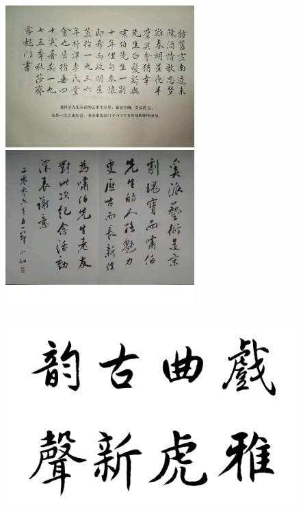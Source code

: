 \documentclass[cjk,slidestop,compress,mathserif,blue]{beamer}
\begin{document}
\frame
{
	\frametitle{}
\begin{figure}[h!]
\centering
\vspace{-0.15in}
\includegraphics[height=0.45\textwidth,width=0.65\textwidth,clip]{Figures_Peking-Opera/PekOpe_Wu-1.jpg}
\vskip -25pt
\includegraphics[height=0.45\textwidth,width=0.65\textwidth,clip]{Figures_Peking-Opera/PekOpe_Wu-2.jpg}
\label{Wu_xiaoru-2}
\end{figure}
}

\frame
{
	\frametitle{}
\begin{figure}[h!]
\centering
\vspace{-0.15in}
\includegraphics[height=0.65\textwidth,width=1.00\textwidth,clip]{Figures_Peking-Opera/PekOpe_Wu-3.jpg}
\label{Wu_xiaoru-3}
\end{figure}
}
\end{document}
